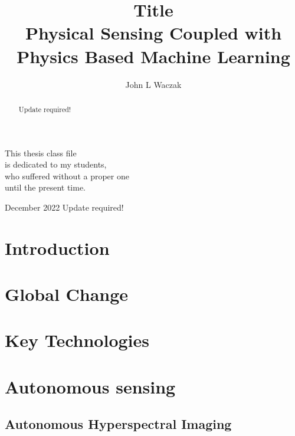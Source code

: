 \documentclass[doublespacing]{utdthesis}
\author{John L Waczak}
\title{Title \\ Physical Sensing Coupled with Physics Based Machine Learning}
\begin{document}
\frontmatter

\signaturepage
{} %

\begin{dedication} %
This thesis class file \\
is dedicated to my students, \\
who suffered without a proper one \\
until the present time.
\end{dedication}

\maketitle

\begin{acks}{December 2022} %
  Update required!
\end{acks}

\begin{abstract}
  Update required!  
\end{abstract}

\tableofcontents
\listoffigures %
\listoftables %

\mainmatter

\chapter{Introduction}
\label{c:introduction}


\chapter{Global Change}
\label{c:GlobalChange}


\chapter{Key Technologies}
\label{c:KeyTechnologies}



\chapter{Autonomous sensing}
\label{c:sensing}
\section{Autonomous Hyperspectral Imaging}
\label{s:hsi}
\end{document}
